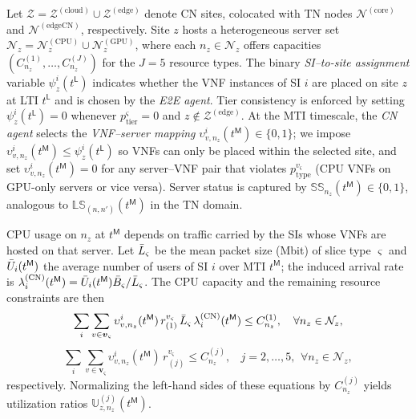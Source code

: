 \documentclass[12pt,lettersize,journal,onecolumn]{IEEEtran}
\begin{document}
Let $\mathcal{Z}=\mathcal{Z}^{(\mathrm{cloud})}\cup\mathcal{Z}^{(\mathrm{edge})}$ denote CN sites, colocated with TN nodes $\mathcal{N}^{(\text{core})}$ and $\mathcal{N}^{(\text{edgeCN})}$, respectively. Site $z$ hosts a heterogeneous server set $\mathcal{N}_z=\mathcal{N}^{(\mathrm{CPU})}_z\cup\mathcal{N}^{(\mathrm{GPU})}_z$, where each $n_z\in\mathcal{N}_z$ offers capacities $(C^{(1)}_{n_z},\dots,C^{(J)}_{n_z})$ for the $J=5$ resource types. The binary \textit{SI–to-site assignment} variable ${\psi}^{i}_{z}(t^\mathsf{L})$ indicates whether the VNF instances of SI $i$ are placed on site $z$ at LTI $t^\mathsf{L}$ and is chosen by the \textit{E2E agent}. Tier consistency is enforced by setting ${\psi}^{i}_{z}(t^\mathsf{L})=0$ whenever $p^{\varsigma}_{\mathrm{tier}}=0$ and $z\notin\mathcal{Z}^{(\mathrm{edge})}$. At the MTI timescale, the \textit{CN agent} selects the \textit{VNF–server mapping} ${\upsilon}^{i}_{v,n_z}(t^\mathsf{M})\in\{0,1\}$; we impose
${\upsilon}^{i}_{v,n_z}(t^\mathsf{M})\le{\psi}^{i}_{z}(t^\mathsf{L})$
so VNFs can only be placed within the selected site, and set
${\upsilon}^{i}_{v,n_z}(t^\mathsf{M})=0$
for any server–VNF pair that violates $p^{v_{\varsigma}}_{\mathrm{type}}$ (CPU VNFs on GPU-only servers or vice versa). Server status is captured by $\mathbb{SS}_{n_z}(t^\mathsf{M})\in\{0,1\}$, analogous to $\mathbb{LS}_{(n,n')}(t^\mathsf{M})$ in the TN domain.

CPU usage on $n_z$ at $t^\mathsf{M}$ depends on traffic carried by the SIs whose VNFs are hosted on that server. Let $\Bar{L}_{\varsigma}$ be the mean packet size (Mbit) of slice type $\varsigma$ and $\Bar{U}_{i}(t^\mathsf{M})$ the average number of users of SI $i$ over MTI $t^\mathsf{M}$; the induced arrival rate is
$\lambda^{\mathrm{(CN)}}_{i}(t^\mathsf{M})=\Bar{U}_{i}(t^\mathsf{M}) \Bar{B}_{\varsigma}/\Bar{L}_{\varsigma}$.
The CPU capacity and the remaining resource constraints are then %
$$
\sum_{i}\sum_{v\in\boldsymbol{v}_{\varsigma}} {\upsilon}^{i}_{v,n_z}(t^\mathsf{M})\,r^{v_{\varsigma}}_{(1)}\,\Bar{L}_{\varsigma}\,\lambda^{\mathrm{(CN)}}_{i}(t^\mathsf{M}) \le C^{(1)}_{n_z},~\,\,\,\,\forall n_z\in\mathcal{N}_z,
$$
$$
\sum_{i}\sum_{v\in\boldsymbol{v}_{\varsigma}} {\upsilon}^{i}_{v,n_z}(t^\mathsf{M})\,r^{v_{\varsigma}}_{(j)} \le C^{(j)}_{n_z},~\,\,\,\,j=2,\dots,5,~\,\forall n_z\in\mathcal{N}_z,
$$
respectively. Normalizing the left-hand sides of these equations by $C^{(j)}_{n_z}$ yields utilization ratios $\mathbb{U}^{(j)}_{z,n_z}(t^\mathsf{M})$. %
\end{document}
